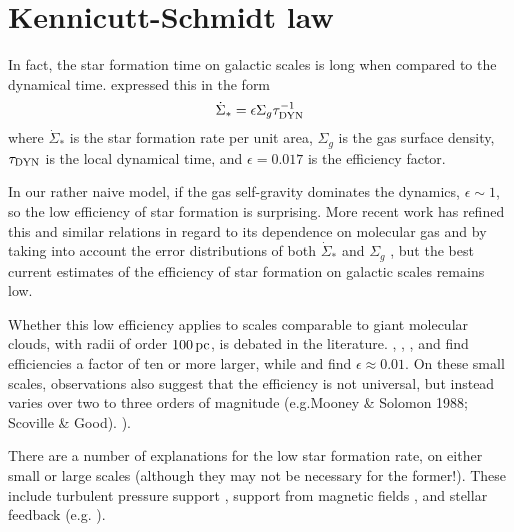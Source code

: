 \documentclass[../dissertation.tex]{subfiles}
\begin{document}
\section{Kennicutt-Schmidt law}
In fact, the star formation time on galactic scales is long when compared to the dynamical time. 
\citet{1998ApJ...498..541K} expressed this in the form
%
\begin{equation}\label{eq:intro_KS_law}
\dot{\Sigma}_* = \epsilon\Sigma_g \tau_{\rm DYN}^{-1}
\end{equation}
%
where $\dot{\Sigma}_*$ is the star formation rate per unit area, $\Sigma_g$ is the 
gas surface density, $\tau_{\rm DYN}$ is the local dynamical time, and $\epsilon = 0.017$ 
is the efficiency factor.  

In our rather naive model, if the gas self-gravity dominates the dynamics, $\epsilon \sim 1$, so the low efficiency of star formation is surprising. 
More recent work has refined this and similar relations in regard to its dependence on molecular gas \citep{2008AJ....136.2846B} and by taking into account the error distributions of both $\dot\Sigma_*$ and $\Sigma_g$ \citep{2013MNRAS.430..288S}, but the best current estimates of the efficiency of star formation on galactic scales remains low. 

Whether this low efficiency applies to scales comparable to giant molecular clouds, with radii of
order $100\,\rm pc$, is debated in the literature.
\citet{2010ApJ...723.1019H}, \citet{2010ApJ...724..687L}, \citet{2010ApJS..188..313W}, and \citet{2011ApJ...729..133M} 
find efficiencies a factor of ten or more larger, while \citet{2007ApJ...654..304K} and \citet{2012ApJ...745...69K} 
find $\epsilon\approx0.01$.
On these small scales, observations also suggest that the efficiency is not universal, but instead 
varies over two to three orders of magnitude (e.g.Mooney \& Solomon 1988; Scoville \& Good).  
\citealt{1988ApJ...334L..51M,2016arXiv160805415L}).%

There are a number of explanations for the low star formation rate, on 
either small or large scales (although they may not be necessary for the former!). 
These include turbulent pressure support \citep{1992ApJ...396..631M}, support from magnetic fields
\citep{1966MNRAS.132..359S,1976ApJ...207..141M}, and stellar feedback (e.g.
\citealt{1986ApJ...303...39D}).  

\end{document}

